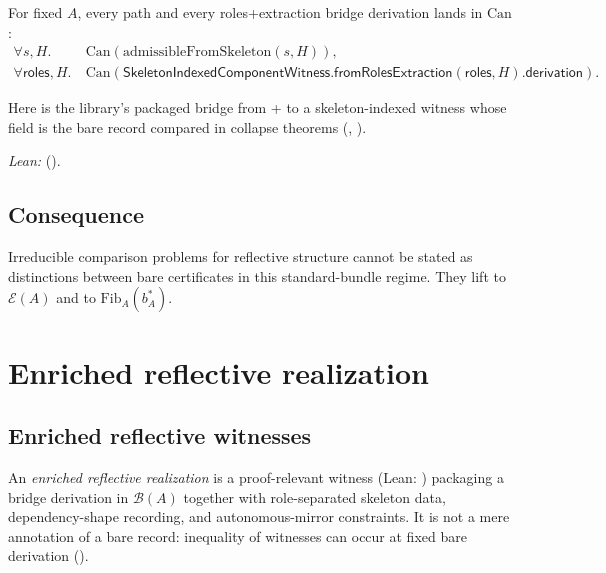 \documentclass[11pt]{article}
\begin{document}
\begin{theorem}\label{thm:ccp-phase2}
For fixed $A$, every  path and every roles+extraction bridge derivation lands in $\mathrm{Can}$:
\[
  \begin{aligned}
    \forall s,H.\ &\mathrm{Can}(\mathrm{admissibleFromSkeleton}(s,H)),\\
    \forall \mathsf{roles},H.\ &\mathrm{Can}(\mathsf{SkeletonIndexedComponentWitness}.\mathsf{fromRolesExtraction}(\mathsf{roles},H).\mathsf{derivation}).
  \end{aligned}
\]
\end{theorem}
\noindent Here  is the library's packaged bridge from  +  to a skeleton-indexed witness whose  field is the bare record compared in collapse theorems (, ).

\noindent\emph{Lean:}  ().

\subsection{Consequence}\label{sec:canonical-cert-consequence}
Irreducible comparison problems for reflective structure cannot be stated as distinctions between bare certificates in this standard-bundle regime. They lift to $\mathcal{E}(A)$ and to $\mathrm{Fib}_A(b^\ast_A)$.

\section{Enriched reflective realization}\label{sec:enriched-realization}

\subsection{Enriched reflective witnesses}\label{sec:enriched-realization-witnesses}
An \emph{enriched reflective realization} is a proof-relevant witness (Lean: ) packaging a bridge derivation in $\mathcal{B}(A)$ together with role-separated skeleton data, dependency-shape recording, and autonomous-mirror constraints. It is not a mere annotation of a bare record: inequality of witnesses can occur at fixed bare derivation ().
\end{document}
